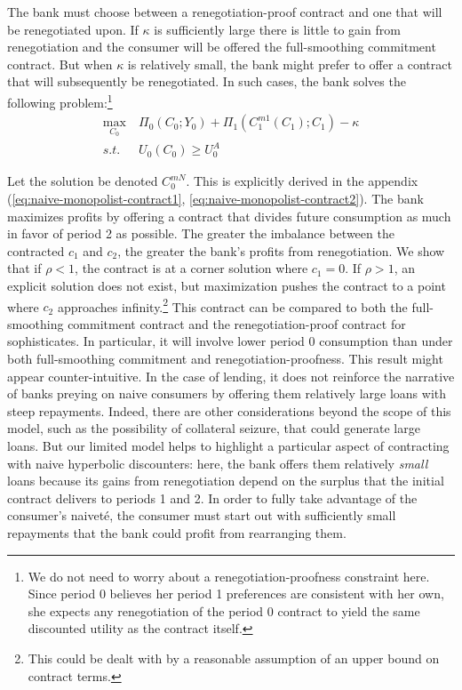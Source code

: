 \documentclass[11pt,english]{article}
\theoremstyle{plain}
\theoremstyle{definition}
\begin{document}
The bank must choose between a renegotiation-proof contract and one
that will be renegotiated upon. If $\kappa$ is sufficiently large
there is little to gain from renegotiation and the consumer will be
offered the full-smoothing commitment contract. But when $\kappa$
is relatively small, the bank might prefer to offer a contract that
will subsequently be renegotiated. In such cases, the bank solves
the following problem:\footnote{We do not need to worry about a renegotiation-proofness constraint
here. Since period 0 believes her period 1 preferences are consistent
with her own, she expects any renegotiation of the period 0 contract
to yield the same discounted utility as the contract itself.} 
\begin{eqnarray}
\underset{C_{0}}{\text{max}} & \ \Pi_{0}\left(C_{0};Y_{0}\right)+\Pi_{1}\left(C_{1}^{m1}\left(C_{1}\right);C_{1}\right)-\kappa\\
s.t. & \ U_{0}\left(C_{0}\right)\geq U_{0}^{A}\label{eq:pc-n}
\end{eqnarray}

Let the solution be denoted $C_{0}^{mN}$. This is explicitly derived
in the appendix (\ref{eq:naive-monopolist-contract1}, \ref{eq:naive-monopolist-contract2}).
The bank maximizes profits by offering a contract that divides future
consumption as much in favor of period 2 as possible. The greater
the imbalance between the contracted $c_{1}$ and $c_{2}$, the greater
the bank's profits from renegotiation. We show that if $\rho<1$,
the contract is at a corner solution where $c_{1}=0$. If $\rho>1$,
an explicit solution does not exist, but maximization pushes the contract
to a point where $c_{2}$ approaches infinity.\footnote{This could be dealt with by a reasonable assumption of an upper bound
on contract terms.} This contract can be compared to both the full-smoothing commitment
contract and the renegotiation-proof contract for sophisticates. In
particular, it will involve lower period 0 consumption than under
both full-smoothing commitment and renegotiation-proofness. This result
might appear counter-intuitive. In the case of lending, it does not
reinforce the narrative of banks preying on naive consumers by offering
them relatively large loans with steep repayments. Indeed, there are
other considerations beyond the scope of this model, such as the possibility
of collateral seizure, that could generate large loans. But our limited
model helps to highlight a particular aspect of contracting with naive
hyperbolic discounters: here, the bank offers them relatively \emph{small}
loans because its gains from renegotiation depend on the surplus that
the initial contract delivers to periods 1 and 2. In order to fully
take advantage of the consumer's naiveté, the consumer must start
out with sufficiently small repayments that the bank could profit
from rearranging them.
\end{document}
